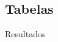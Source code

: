 \documentclass[
	12pt,				%
	openright,			%
	oneside,			%
	a4paper,			%
	english,			%
	brazil				%
	]{dissertacao-ufrgs-abntex2}
\begin{document}
%
%


\begin{apendicesenv}
%
\partapendices
%



\chapter{Tabelas} \label{tabelas-resultados}

Resultados


\end{apendicesenv}
\end{document}
